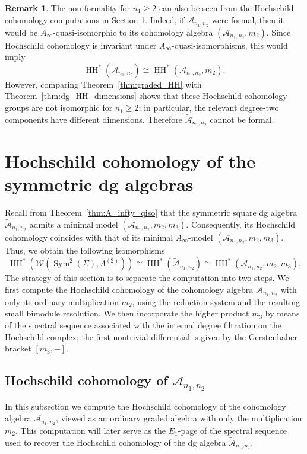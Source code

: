 \documentclass[a4paper, reqno, 11pt]{amsart}
\theoremstyle{definition}
\newtheorem{remark}[theorem]{Remark}
\begin{document}
\begin{remark}\normalfont
	The non-formality for \(n_1\geq 2\) can also be seen from the Hochschild cohomology computations in Section \ref{section:hhcohomology}. Indeed, if \(\widetilde{\mathcal A}_{n_1,n_2}\) were formal, then it would be $A_\infty$-quasi-isomorphic to its cohomology algebra \((\mathcal A_{n_1,n_2},m_2)\). Since Hochschild cohomology is invariant under $A_\infty$-quasi-isomorphisms, this would imply
	\[
	\operatorname{HH}^*(\widetilde{\mathcal A}_{n_1,n_2})
	\cong
	\operatorname{HH}^*(\mathcal A_{n_1,n_2},m_2).
	\]
	However, comparing Theorem~\ref{thm:graded_HH} with Theorem~\ref{thm:dg_HH_dimensions} shows that these Hochschild cohomology groups are not isomorphic for \(n_1\geq 2\); in particular, the relevant degree-two components have different dimensions. Therefore \(\widetilde{\mathcal A}_{n_1,n_2}\) cannot be formal.
\end{remark}



\section{Hochschild cohomology of the symmetric dg algebras}\label{section:hhcohomology}
Recall from Theorem~\ref{thm:A_infty_qiso} that the symmetric square dg algebra $\widetilde{\mathcal{A}}_{n_1,n_2}$ admits a minimal model $(\mathcal A_{n_1,n_2}, m_2, m_3)$.  
Consequently, its Hochschild cohomology coincides with that of its minimal $A_\infty$-model $(\mathcal A_{n_1,n_2}, m_2, m_3)$.  
Thus, we obtain the following isomorphisms 
\[\operatorname{HH}^*(\mathcal{W}(\operatorname{Sym}^2(\Sigma), \Lambda^{(2)})) \cong \operatorname{HH}^*(\widetilde{\mathcal{A}}_{n_1,n_2}) \cong \operatorname{HH}^*(\mathcal A_{n_1,n_2}, m_2, m_3).\]
The strategy of this section is to separate the computation into two steps. We first compute the Hochschild cohomology of the cohomology algebra \(\mathcal A_{n_1,n_2}\) with only its ordinary multiplication \(m_2\), using the reduction system and the resulting small bimodule resolution. We then incorporate the higher product \(m_3\) by means of the spectral sequence associated with the internal degree filtration on the Hochschild complex; the first nontrivial differential is given by the Gerstenhaber bracket \([m_3,-]\).


\subsection{Hochschild cohomology of $\mathcal{A}_{n_1,n_2}$} 
In this subsection we compute the Hochschild cohomology of the cohomology algebra \(\mathcal A_{n_1,n_2}\), viewed as an ordinary graded algebra with only the multiplication \(m_2\). This computation will later serve as the \(E_1\)-page of the spectral sequence used to recover the Hochschild cohomology of the dg algebra \(\widetilde{\mathcal A}_{n_1,n_2}\).
\end{document}
